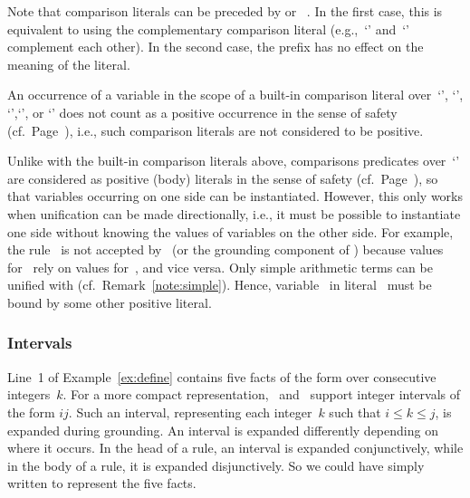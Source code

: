 \begin{note}
Note that comparison literals can be preceded by  or ~.
In the first case, this is equivalent to using the complementary comparison literal
(e.g.,~`\code{<}' and~`\code{>=}' complement each other).
In the second case, the prefix has no effect on the meaning of the literal.

An occurrence of a variable in the scope of a built-in comparison literal over~`\code{!=}', `\code{<}', `\code{<=}',`\code{>}', or `\code{>=}'
does not count as a positive occurrence in the sense of safety (cf.\ Page~\pageref{pg:safe}),
i.e.,
such comparison literals are not considered to be positive.

Unlike with the built-in comparison literals above,
comparisons predicates over~`\code{=}' are considered as positive (body) literals in the sense of safety (cf.\ Page~\pageref{pg:safe}),
so that variables occurring on one side can be instantiated.
However, this only works when unification can be made directionally,
i.e., it must be possible to instantiate one side without knowing the values of variables on the other side.
For example, the rule~
is not accepted by \gringo\ (or the grounding component of \clingo)
because values for~ rely on values for~, and vice versa.
Only simple arithmetic terms can be unified with (cf.\ Remark~\ref{note:simple}).
Hence, variable~ in literal~ must be bound by some other positive literal.
%
%
\end{note}

\subsubsection{Intervals}\label{subsec:gringo:interval}

Line~1 of Example~\ref{ex:define} contains
five facts of the form 
over consecutive integers~$k$.
For a more compact representation,
\gringo\ and \clingo\ support integer intervals of the form $i$$j$.
Such an interval, representing each integer~$k$ such that $i\leq k\leq j$,
is expanded during grounding.
An interval is expanded differently depending on where it occurs.
In the head of a rule, an interval is expanded conjunctively,
while in the body of a rule, it is expanded disjunctively.
So we could have simply written  to represent the five facts.

